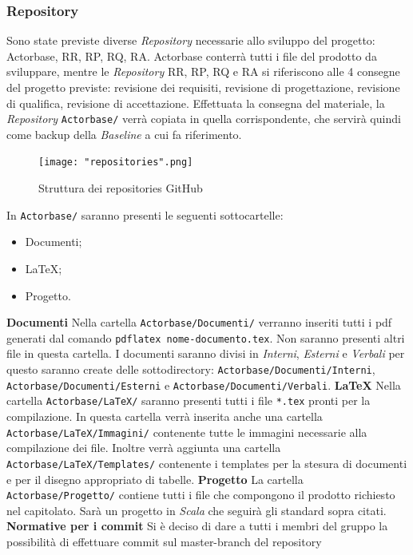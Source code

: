 \documentclass[a4paper]{article}
\begin{document}
	\subsubsection{Repository}
	Sono state previste diverse \emph{Repository} necessarie allo sviluppo del progetto: Actorbase,
	RR, RP, RQ, RA. 	Actorbase conterrà tutti i file del prodotto da sviluppare, mentre le
	 \emph{Repository} RR, RP, RQ e RA si riferiscono alle 4 consegne del progetto previste:
	 revisione dei requisiti, revisione di progettazione, revisione di qualifica, revisione di
	  accettazione. Effettuata la consegna del materiale, la \emph{Repository}
	  \verb|Actorbase/| verrà copiata in quella corrispondente, che servirà quindi come
	  backup della \emph{Baseline} a cui fa riferimento.
  	\begin{figure}[H]
		\centering
		\texttt{[image: "repositories".png]}
		\caption{Struttura dei repositories GitHub}
	\end{figure}
	In \verb|Actorbase/| saranno presenti le seguenti sottocartelle:
	\begin{itemize}
		\item Documenti;
		\item LaTeX;
		\item Progetto.
	\end{itemize}
	\textbf{Documenti}
	Nella cartella \verb|Actorbase/Documenti/| verranno inseriti tutti i pdf generati dal comando \verb|pdflatex nome-documento.tex|. Non
	saranno presenti altri file in questa cartella. I documenti saranno divisi in \emph{Interni}, \emph{Esterni} e
	\emph{Verbali} per questo saranno create delle sottodirectory: \verb|Actorbase/Documenti/Interni|, \verb|Actorbase/Documenti/Esterni|
	e \verb|Actorbase/Documenti/Verbali|.
	\textbf{LaTeX}
	Nella cartella \verb|Actorbase/LaTeX/| saranno presenti tutti i file \verb|*.tex| pronti per la compilazione. In questa cartella verrà inserita
	anche una cartella\\ \verb|Actorbase/LaTeX/Immagini/| contenente tutte le immagini necessarie alla compilazione dei file.
	Inoltre verrà aggiunta una cartella \verb|Actorbase/LaTeX/Templates/| contenente i templates per la stesura di documenti e per il
	disegno appropriato di tabelle.
	\textbf{Progetto}
	La cartella \verb|Actorbase/Progetto/| contiene tutti i file che compongono il prodotto richiesto nel capitolato. Sarà  un progetto in
	\emph{Scala} che seguirà gli standard sopra citati.
	\textbf{Normative per i commit}
		Si è deciso di dare a tutti i membri del gruppo la possibilità di effettuare commit sul master-branch del repository
\end{document}

